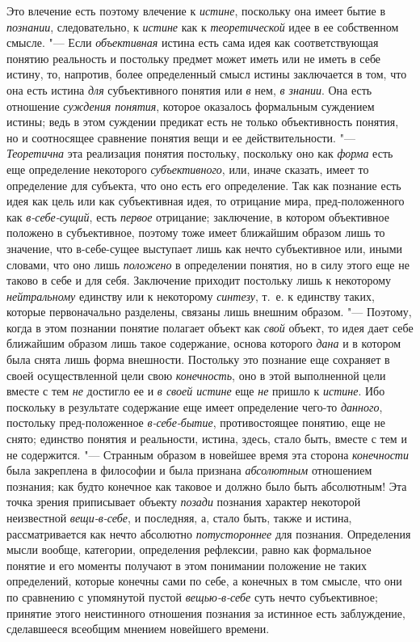 {{Это влечение есть поэтому влечение к {\em истине}, поскольку
она имеет бытие в {\em познании}, следовательно, к {\em истине} как к
{\em теоретической} идее в ее собственном смысле. "--- Если
{\em объективная} истина
есть сама идея как соответствующая понятию реальность и постольку предмет
может иметь или не иметь в себе истину, то, напротив, более определенный
смысл истины заключается в том, что она есть истина
{\em для} субъективного понятия или {\em в} нем, {\em в знании}. Она есть
отношение {\em суждения понятия},
которое оказалось формальным суждением истины; ведь в этом
суждении предикат есть не только объективность понятия, но и соотносящее
сравнение понятия вещи и ее действительности. "---
{\em Теоретична} эта реализация понятия постольку, поскольку оно как
{\em форма} есть еще определение некоторого {\em субъективного}, или,
иначе сказать, имеет то определение для субъекта, что оно есть его
определение. Так как познание есть идея как цель или как субъективная идея,
то отрицание мира, пред-положенного как {\em в-себе-сущий}, есть
{\em первое} отрицание;
заключение, в котором объективное положено в субъективное, поэтому тоже
имеет ближайшим образом лишь то значение, что в-себе-сущее выступает лишь
как нечто субъективное или, иными словами, что оно лишь
{\em положено} в
определении понятия, но в силу этого еще не таково в себе и для себя.
Заключение приходит постольку лишь к некоторому
{\em нейтральному} единству или к некоторому {\em синтезу}, т.~е. к
единству таких, которые первоначально разделены, связаны лишь внешним
образом. "--- Поэтому, когда в этом познании понятие полагает
объект как {\em свой}
объект, то идея дает себе ближайшим образом лишь такое
содержание, основа которого {\em дана}
и в котором была снята лишь форма внешности. Постольку это
познание еще сохраняет в своей осуществленной цели свою
{\em конечность}, оно в этой выполненной цели вместе с тем
{\em не} достигло ее и {\em в своей истине} еще
{\em не} пришло к {\em истине}. Ибо
поскольку в результате содержание еще имеет определение чего-то
{\em данного}, постольку
пред-положенное {\em в-себе-бытие},
противостоящее понятию, еще не снято; единство понятия и
реальности, истина, здесь, стало быть, вместе с тем и не содержится. "---
Странным образом в новейшее время эта сторона {\em конечности} была
закреплена в философии и была признана {\em абсолютным} отношением
познания;
как будто конечное как таковое и должно было быть абсолютным!
Эта точка зрения приписывает объекту {\em позади} познания
характер некоторой неизвестной {\em вещи-в-себе}, и
последняя, а, стало быть, также и истина, рассматривается
как нечто абсолютно {\em потустороннее}
для познания. Определения мысли вообще, категории,
определения рефлексии, равно как формальное понятие и его моменты получают
в этом понимании положение не таких определений, которые конечны сами по
себе, а конечных в том смысле, что они по сравнению с упомянутой пустой
{\em вещью-в-себе} суть
нечто субъективное; принятие этого неистинного отношения познания за
истинное есть заблуждение, сделавшееся всеобщим мнением новейшего времени.

}}
